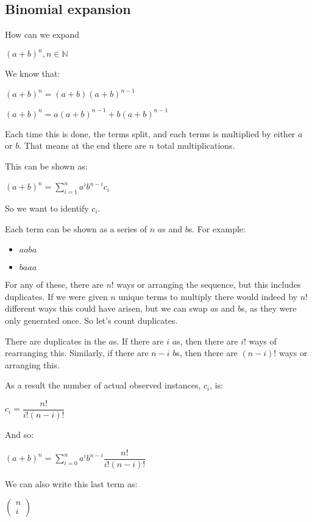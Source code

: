 
\subsection{Binomial expansion}

How can we expand

\((a+b)^n, n\in \mathbb{N}\)

We know that:

\((a+b)^n=(a+b)(a+b)^{n-1}\)

\((a+b)^n=a(a+b)^{n-1}+b(a+b)^{n-1}\)

Each time this is done, the terms split, and each terms is multiplied by either \(a\) or \(b\). That means at the end there are \(n\) total multiplications.

This can be shown as:

\((a+b)^n=\sum_{i=1}^n a^i b^{n-i} c_i\)

So we want to identify \(c_i\).

Each term can be shown as a series of \(n\) \(a\)s and \(b\)s. For example:

\begin{itemize}
\item \(aaba\)
\item \(baaa\)
\end{itemize}

For any of these, there are \(n!\) ways or arranging the sequence, but this includes duplicates. If we were given \(n\) unique terms to multiply there would indeed by \(n!\) different ways this could have arisen, but we can swap \(a\)s and \(b\)s, as they were only generated once. So let's count duplicates.

There are duplicates in the \(a\)s. If there are  \(i\) \(a\)s, then there are \(i!\) ways of rearranging this. Similarly, if there are \(n-i\) \(b\)s, then there are \((n-i)!\) ways or arranging this.

As a result the number of actual observed instances, \(c_i\), is:

\(c_i=\dfrac{n!}{i!(n-i)!}\)

And so:

\((a+b)^n=\sum^n_{i=0} a^i b^{n-i} \dfrac{n!}{i!(n-i)!}\)

We can also write this last term as:

\(\begin{pmatrix}n\\i\end{pmatrix}\)

